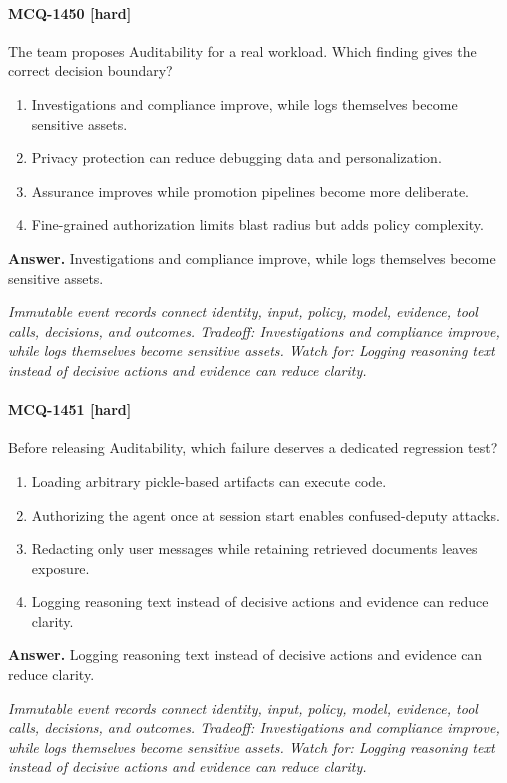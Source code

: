 \paragraph{MCQ-1450 [hard]} The team proposes Auditability for a real workload. Which finding gives the correct decision boundary?
\begin{enumerate}[label=\Alph*.]
\item Investigations and compliance improve, while logs themselves become sensitive assets.
\item Privacy protection can reduce debugging data and personalization.
\item Assurance improves while promotion pipelines become more deliberate.
\item Fine-grained authorization limits blast radius but adds policy complexity.
\end{enumerate}
\noindent\textbf{Answer.} Investigations and compliance improve, while logs themselves become sensitive assets.
\par\textit{Immutable event records connect identity, input, policy, model, evidence, tool calls, decisions, and outcomes. Tradeoff: Investigations and compliance improve, while logs themselves become sensitive assets. Watch for: Logging reasoning text instead of decisive actions and evidence can reduce clarity.}
\paragraph{MCQ-1451 [hard]} Before releasing Auditability, which failure deserves a dedicated regression test?
\begin{enumerate}[label=\Alph*.]
\item Loading arbitrary pickle-based artifacts can execute code.
\item Authorizing the agent once at session start enables confused-deputy attacks.
\item Redacting only user messages while retaining retrieved documents leaves exposure.
\item Logging reasoning text instead of decisive actions and evidence can reduce clarity.
\end{enumerate}
\noindent\textbf{Answer.} Logging reasoning text instead of decisive actions and evidence can reduce clarity.
\par\textit{Immutable event records connect identity, input, policy, model, evidence, tool calls, decisions, and outcomes. Tradeoff: Investigations and compliance improve, while logs themselves become sensitive assets. Watch for: Logging reasoning text instead of decisive actions and evidence can reduce clarity.}

